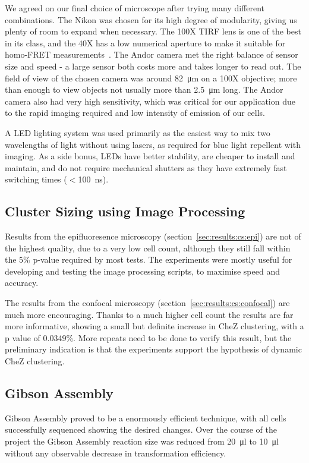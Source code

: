 \documentclass[../main.tex]{subfiles}
\begin{document}
We agreed on our final choice of microscope after trying many different combinations. The Nikon was chosen for its high degree of modularity, giving us plenty of room to expand when necessary. The 100X TIRF lens is one of the best in its class, and the 40X has a low numerical aperture to make it suitable for homo-FRET measurements~\citep{lakowicz}. The Andor camera met the right balance of sensor size and speed - a large sensor both costs more and takes longer to read out. The field of view of the chosen camera was around \SI{82}{\micro\meter} on a 100X objective; more than enough to view objects not usually more than \SI{2.5}{\micro\meter} long. The Andor camera also had very high sensitivity, which was critical for our application due to the rapid imaging required and low intensity of emission of our cells.

A LED lighting system was used primarily as the easiest way to mix two wavelengths of light without using lasers, as required for blue light repellent with imaging. As a side bonus, LEDs have better stability, are cheaper to install and maintain, and do not require mechanical shutters as they have extremely fast switching times (\(<\)\SI{100}{\nano\second}). 

\subsection{Cluster Sizing using Image Processing}

Results from the epifluoresence microscopy (section~\ref{sec:results:cs:epi}) are not of the highest quality, due to a very low cell count, although they still fall within the 5\% p-value required by most tests. The experiments were mostly useful for developing and testing the image processing scripts, to maximise speed and accuracy.

The results from the confocal microscopy (section~\ref{sec:results:cs:confocal}) are much more encouraging. Thanks to a much higher cell count the results are far more informative, showing a small but definite increase in CheZ clustering, with a p value of 0.0349\%. More repeats need to be done to verify this result, but the preliminary indication is that the experiments support the hypothesis of dynamic CheZ clustering.

\subsection{Gibson Assembly}
Gibson Assembly proved to be a enormously efficient technique, with all cells successfully sequenced showing the desired changes. Over the course of the project the Gibson Assembly reaction size was reduced from \SI{20}{\micro\litre} to \SI{10}{\micro\litre} without any observable decrease in transformation efficiency. 
\end{document}
